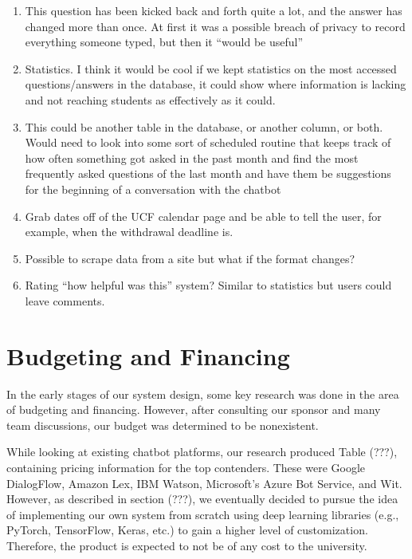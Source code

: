 \documentclass[titlepage, 12pt]{article}
\begin{document}
\begin{enumerate}
    \item This question has been kicked back and forth quite a lot, and the answer has changed more than once. At first it was a possible breach of privacy to record everything someone typed, but then it “would be useful” 
    \item Statistics. I think it would be cool if we kept statistics on the most accessed questions/answers in the database, it could show where information is lacking and not reaching students as effectively as it could.
    \item This could be another table in the database, or another column, or both. Would need to look into some sort of scheduled routine that keeps track of how often something got asked in the past month and find the most frequently asked questions of the last month and have them be suggestions for the beginning of a conversation with the chatbot
    \item Grab dates off of the UCF calendar page and be able to tell the user, for example, when the withdrawal deadline is.
    \item Possible to scrape data from a site but what if the format changes?
    \item Rating “how helpful was this” system? Similar to statistics but users could leave comments.

\end{enumerate}



\pagebreak
\section{Budgeting and Financing}

In the early stages of our system design, some key research was done in the area of budgeting and financing. However, after consulting our sponsor and many team discussions, our budget was determined to be nonexistent.

While looking at existing chatbot platforms, our research produced Table (???), containing pricing information for the top contenders. These were Google DialogFlow, Amazon Lex, IBM Watson, Microsoft’s Azure Bot Service, and Wit. However, as described in section (???), we eventually decided to pursue the idea of implementing our own system from scratch using deep learning libraries (e.g., PyTorch, TensorFlow, Keras, etc.) to gain a higher level of customization. Therefore, the product is expected to not be of any cost to the university.
\end{document}
